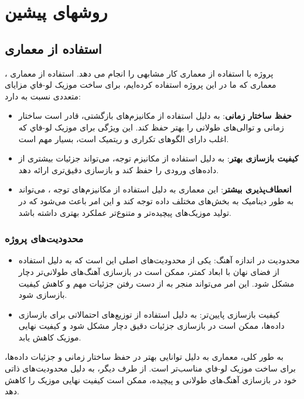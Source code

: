 \section{روشهای پيشين}
\subsection{استفاده از معماری }
پروژه  \cite{Zhang} با استفاده از معماری  کار مشابهی را انجام می دهد.
استفاده از معماری ، معماری که ما در این پروژه استفاده کرده‌ایم، برای ساخت موزیک
ﻟﻮ-ﻓﺎﻱ  مزایای متعددی نسبت به   دارد:

\begin{itemize}
      \def\labelenumi{\arabic{enumi}.}
      \item
            \textbf{حفظ ساختار زمانی}:  به دلیل استفاده از مکانیزم‌های بازگشتی،
            قادر است ساختار زمانی و توالی‌های طولانی را بهتر حفظ کند. این ویژگی
            برای موزیک ﻟﻮ-ﻓﺎﻱ که اغلب دارای الگوهای تکراری و ریتمیک است، بسیار مهم
            است.
      \item
            \textbf{کیفیت بازسازی بهتر}:  به دلیل استفاده از مکانیزم توجه، می‌تواند جزئیات بیشتری از داده‌های ورودی را حفظ کند و بازسازی
            دقیق‌تری ارائه دهد.
      \item
            \textbf{انعطاف‌پذیری بیشتر}: این معماری به دلیل استفاده از مکانیزم‌های
            توجه  ، می‌تواند به طور دینامیک به بخش‌های مختلف داده توجه کند و این امر
            باعث می‌شود که در تولید موزیک‌های پیچیده‌تر و متنوع‌تر عملکرد بهتری داشته
            باشد.
\end{itemize}

\subsubsection{محدودیت‌های
      پروژه }

\begin{itemize}
      \item{محدودیت در اندازه آهنگ}: یکی از محدودیت‌های اصلی  این است که
            به دلیل استفاده از فضای نهان با ابعاد کمتر، ممکن است در بازسازی
            آهنگ‌های طولانی‌تر دچار مشکل شود. این امر می‌تواند منجر به از دست رفتن
            جزئیات مهم و کاهش کیفیت بازسازی شود.
      \item{کیفیت بازسازی پایین‌تر}:  به دلیل استفاده از توزیع‌های
            احتمالاتی برای بازسازی داده‌ها، ممکن است در بازسازی جزئیات دقیق دچار
            مشکل شود و کیفیت نهایی موزیک کاهش یابد.
\end{itemize}
به طور کلی، معماری  به دلیل توانایی بهتر در حفظ ساختار زمانی و
جزئیات داده‌ها، برای ساخت موزیک ﻟﻮ-ﻓﺎﻱ مناسب‌تر است. از طرف دیگر،  به
دلیل محدودیت‌های ذاتی خود در بازسازی آهنگ‌های طولانی و پیچیده، ممکن است
کیفیت نهایی موزیک را کاهش دهد.

